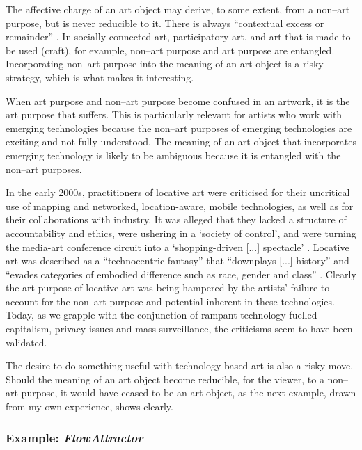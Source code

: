 \documentclass[letter:wpaper]{article}
\begin{document}
    The affective charge of an art object may derive, to some extent, from a non–art purpose, but is never reducible to it. There is always “contextual excess or remainder” \citep[p.252]{MassumiPrblsFrThVrtl2002}. In socially connected art, participatory art, and art that is made to be used (craft), for example, non–art purpose and art purpose are entangled. Incorporating non–art purpose into the meaning of an art object is a risky strategy, which is what makes it interesting.
    
    When art purpose and non–art purpose become confused in an artwork, it is the art purpose that suffers. This is particularly relevant for artists who work with emerging technologies because the non–art purposes of emerging technologies are exciting and not fully understood. The meaning of an art object that incorporates emerging technology is likely to be ambiguous because it is entangled with the non–art purposes.
    
	In the early 2000s, practitioners of locative art were criticised for their uncritical use of mapping and networked, location-aware, mobile technologies, as well as for their collaborations with industry. It was alleged that they lacked a structure of accountability and ethics, were ushering in a `society of control', and were turning the media-art conference circuit into a `shopping-driven [...] spectacle' \citep[p.358]{beyondLocativeMedia2006}. Locative art was described as a “technocentric fantasy” that “downplays [...] history” and “evades categories of embodied difference such as race, gender and class” \citep[para. 2]{questioningTheFrame2004}. Clearly the art purpose of locative art was being hampered by the artists' failure to account for the non–art purpose and potential inherent in these technologies. Today, as we grapple with the conjunction of rampant technology-fuelled capitalism, privacy issues and mass surveillance, the criticisms seem to have been validated. 

    The desire to do something useful with technology based art is also a risky move. Should the meaning of an art object become reducible, for the viewer, to a non–art purpose, it would have ceased to be an art object, as the next example, drawn from my own experience, shows clearly.

    \subsubsection{Example: \emph{FlowAttractor}}
\end{document}
